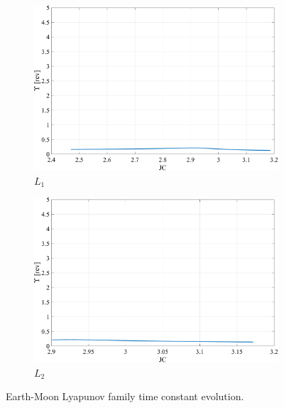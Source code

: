 \begin{figure}[H]
    \begin{subfigure}[h]{0.4\linewidth}
        \includegraphics[width=\textwidth]{figures/L1LyapunovTimeConstant.pdf}
        \caption{$L_{1}$}
    \end{subfigure}
    \hfill
    \begin{subfigure}[h]{0.4\linewidth}
        \includegraphics[width=\textwidth]{figures/L2LyapunovTimeConstant.pdf}
        \caption{$L_{2}$}
    \end{subfigure}
    \caption{Earth-Moon Lyapunov family time constant evolution.}
    \label{fig:timeConstant}
\end{figure}

